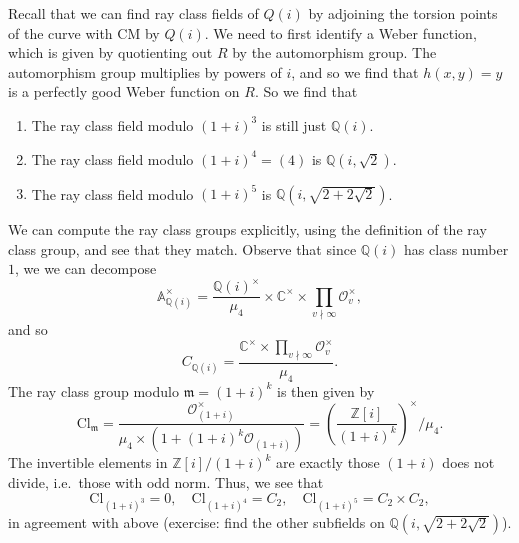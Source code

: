 \documentclass{shortart}
\theoremstyle{definition}
\newcommand\A{\mathbb{A}}
\newcommand\C{\mathbb{C}}
\newcommand\Z{\mathbb{Z}}
\newcommand\Q{\mathbb{Q}}
\newcommand\Cl{\mathrm{Cl}}
\begin{document}
Recall that we can find ray class fields of $Q(i)$ by adjoining the torsion points of the curve with CM by $Q(i)$. We need to first identify a Weber function, which is given by quotienting out $R$ by the automorphism group. The automorphism group multiplies by powers of $i$, and so we find that $h(x, y) = y$ is a perfectly good Weber function on $R$. So we find that
\begin{enumerate}
  \item The ray class field modulo $(1 + i)^3$ is still just $\Q(i)$.
  \item The ray class field modulo $(1 + i)^4 = (4)$ is $\Q(i, \sqrt{2})$.
  \item The ray class field modulo $(1 + i)^5$ is $\Q(i, \sqrt{2 + 2 \sqrt{2}})$.
\end{enumerate}
We can compute the ray class groups explicitly, using the definition of the ray class group, and see that they match. Observe that since $\Q(i)$ has class number $1$, we we can decompose
\[
  \A_{\Q(i)}^\times = \frac{\Q(i)^\times}{\mu_4} \times \C^\times \times \prod_{v \nmid \infty} \mathcal{O}_v^\times,
\]
and so
\[
  C_{\Q(i)} = \frac{\C^\times \times \prod_{v \nmid \infty} \mathcal{O}_v^\times}{\mu_4}.
\]
The ray class group modulo $\mathfrak{m} = (1 + i)^k$ is then given by
\[
  \Cl_\mathfrak{m} = \frac{\mathcal{O}_{(1 + i)}^\times}{\mu_4 \times (1 + (1 + i)^k \mathcal{O}_{(1 + i)})} = \left(\frac{\Z[i]}{(1 + i)^k}\right)^\times \Big/ \mu_4.
\]
The invertible elements in $\Z[i]/(1 + i)^k$ are exactly those $(1 + i)$ does not divide, i.e.\ those with odd norm. Thus, we see that
\[
  \Cl_{(1 + i)^3} = 0,\quad \Cl_{(1 + i)^4} = C_2,\quad \Cl_{(1 + i)^5} = C_2 \times C_2,
\]
in agreement with above (exercise: find the other subfields on $\Q(i, \sqrt{2 + 2\sqrt{2}})$).
\end{document}
